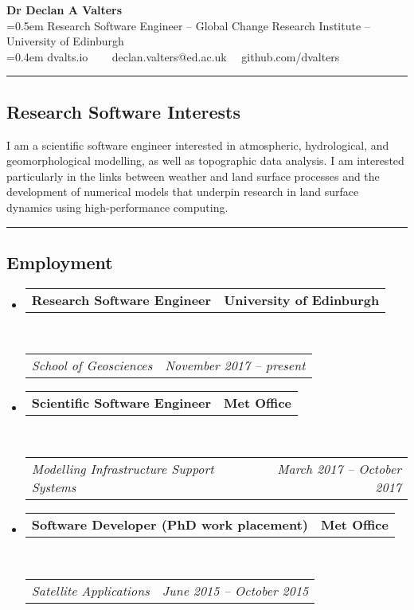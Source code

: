 \documentclass[10.5pt,a4]{article}
\makeatletter
\newcommand{\headerrow}[2]
{\begin{tabular*}{\linewidth}{l@{\extracolsep{\fill}}r}
	#1 &
	#2 \\
\end{tabular*}}
\makeatother
\begin{document}
\begin{center}
{\LARGE \textbf{Dr Declan A Valters}} \\
\parskip=0.5em
{Research Software Engineer -- Global Change Research Institute -- University of Edinburgh} \\
\parskip=0.4em
dvalts.io  \ \textbullet
\ \ declan.valters@ed.ac.uk \ \textbullet \ github.com/dvalters
\end{center}


\hrule
\vspace{-0.4em}
\subsection*{Research Software Interests}
I am a scientific software engineer interested in atmospheric, hydrological, and geomorphological modelling, as well as topographic data analysis. I am interested particularly in the links between weather and land surface processes and the development of numerical models that underpin research in land surface dynamics using high-performance computing.
\vspace{1em}

\hrule
\vspace{-0.4em}


\subsection*{Employment}
\begin{itemize}
	\parskip=0.1em

	\item
	\headerrow
		{\textbf{Research Software Engineer}}
		{\textbf{University of Edinburgh}}
	\\
	\headerrow
		{\emph{School of Geosciences}}
		{\emph{November 2017 -- present}}

	\item
	\headerrow
		{\textbf{Scientific Software Engineer}}
		{\textbf{Met Office}}
	\\
	\headerrow
		{\emph{Modelling Infrastructure Support Systems}}
		{\emph{March 2017 -- October 2017}}

	\item
	\headerrow
		{\textbf{Software Developer (PhD work placement)}}
		{\textbf{Met Office}}
	\\
	\headerrow
		{\emph{Satellite Applications}}
		{\emph{June 2015 -- October 2015}}

\end{itemize}
\end{document}
